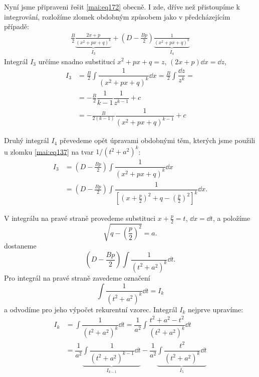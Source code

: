       Nyní jsme připraveni řešit \ref{mai:eq172} obecně. I zde, dříve než přistoupíme k integrování,
      rozložíme zlomek obdobným způsobem jako v předcházejícím případě:
      \begin{gather*}
        \frac{B}{2}\underbrace{\frac{2x + p}{(x^2+px+q)^k}}_{I_3} + 
        \left(D - \frac{Bp}{2}\right)\underbrace{\frac{1}{(x^2+px+q)^k}}_{I_4}
      \end{gather*} 
      Integrál \(I_3\) určíme snadno substitucí \(x^2+px+q = z\), \((2x+p)\dd{x} = \dd{z}\),
      \begin{align}
        I_3 &= \frac{B}{2}\int\dfrac{1}{(x^2+px+q)^k}\dd{x} 
             = \frac{B}{2}\int\dfrac{\dd{z}}{z^k} =                                \nonumber   \\
            &=-\frac{B}{2}\dfrac{1}{k-1}\dfrac{1}{z^{k-1}} + c                     \nonumber   \\
            &=-\frac{B}{2(k-1)}\dfrac{1}{(x^2+px+q)^{k-1}} + c                     \label{mai:eq173} 
      \end{align}      

      Druhý integrál \(I_4\) převedeme opět úpravami obdobnými těm, kterých jsme použili u zlomku
      \ref{mai:eq137} na tvar \(1/(t^2+a^2)^k\):
      \begin{align*}
        I_3 &= \left(D - \frac{Bp}{2}\right)\int\dfrac{1}{(x^2+px+q)^k}\dd{x}      \nonumber   \\  
            &= \left(D - \frac{Bp}{2}\right)\int\dfrac{1}{
                  \left[
                    \left(
                      x+\frac{p}{2}
                    \right)^2+q-
                    \left(
                      \frac{p}{2}
                    \right)^2
                  \right]^k
                }\dd{x}.
      \end{align*}    

      V integrálu na pravé straně provedeme substituci \(x + \frac{p}{2} = t\), \(\dd{x} = \dd{t}\),
      a položíme 
      \begin{equation*}
        \sqrt{q - \left(\dfrac{p}{2}\right)^2} = a.
      \end{equation*}
      dostaneme
      \begin{equation*}
        \left(D - \frac{Bp}{2}\right)\int\dfrac{1}{(t^2+a^2)^k}\dd{t}.
      \end{equation*}
      Pro integrál na pravé straně zavedeme označení
      \begin{equation*}
        \int\dfrac{1}{(t^2+a^2)^k}\dd{t} = I_k
      \end{equation*}
      a odvodíme pro jeho výpočet rekurentní vzorec. Integrál \(I_k\) nejprve upravíme:
      \begin{align*}
        I_k &= \int\dfrac{1}{(t^2+a^2)^k}\dd{t} 
             = \dfrac{1}{a^2}\int\dfrac{t^2+a^2-t^2}{(t^2+a^2)^k}\dd{t}                       \\
            &= \dfrac{1}{a^2}\underbrace{\int\dfrac{1}{(t^2+a^2)^{k-1}}\dd{t}}_{I_{k-1}}          
             - \dfrac{1}{a^2}\underbrace{\int\dfrac{t^2}{(t^2+a^2)^k}\dd{t}}_{I_5}                
      \end{align*}

